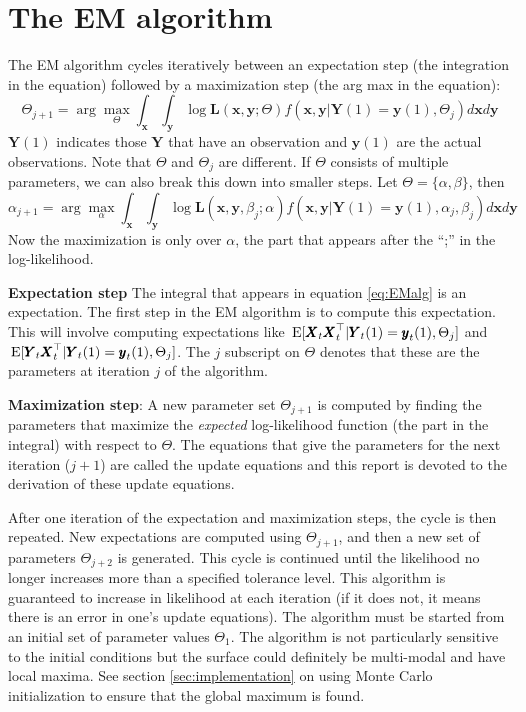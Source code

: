\documentclass[]{article}
\def\E{\,\textup{\textrm{E}}}
\def\LL{\mbox{$\mathbf L$}}	\def\ll{\mbox{$\mathbf l$}}
\def\XX{\mbox{$\pmb{X}$}}	\def\xx{\mbox{$\pmb{x}$}}
\def\YY{\mbox{$\pmb{Y}$}}	\def\yy{\mbox{$\pmb{y}$}}
\begin{document}
\section{The EM algorithm}\label{sec:EMalgorithm}
The EM algorithm cycles iteratively between an expectation step (the integration in the equation) followed by a maximization step (the arg max in the equation):
\begin{equation}\label{eq:EMalg}
\Theta_{j+1} = \arg \underset{\Theta}{\max} \int_{\xx}{\int_{\yy}{\log\LL(\xx,\yy;\Theta) f(\xx,\yy|\YY(1)=\yy(1),\Theta_j)d\xx d\yy}}
\end{equation}
$\YY(1)$ indicates those $\YY$ that have an observation and $\yy(1)$ are the actual observations. Note that $\Theta$ and $\Theta_j$ are different.  If $\Theta$ consists of multiple parameters, we can also break this down into smaller steps.  Let $\Theta=\{\alpha,\beta\}$, then
\begin{equation}\label{eq:EMalg.j}
\alpha_{j+1} = \arg \underset{\alpha}{\max} \int_{\xx}{\int_{\yy}{\log\LL(\xx,\yy,\beta_j;\alpha) f(\xx,\yy|\YY(1)=\yy(1),\alpha_j,\beta_j)d\xx d\yy}}
\end{equation}
Now the maximization is only over $\alpha$, the part that appears after the ``;'' in the log-likelihood.

\textbf{Expectation step} The integral that appears in equation \ref{eq:EMalg} is an expectation. The first step in the EM algorithm is to compute this expectation.  This will involve computing expectations like $\E[\XX_t\XX_t^\top|\YY_t(1)=\yy_t(1),\Theta_j]$ and $\E[\YY_t\XX_t^\top|\YY_t(1)=\yy_t(1),\Theta_j]$. The $j$ subscript on $\Theta$ denotes that these are the parameters at iteration $j$ of the algorithm.

\textbf{Maximization step}: A new parameter set $\Theta_{j+1}$ is computed by finding the parameters that maximize the \textit{expected} log-likelihood function (the part in the integral) with respect to $\Theta$.  The equations that give the parameters for the next iteration ($j+1$) are called the update equations and this report is devoted to the derivation of these update equations.

After one iteration of the expectation and maximization steps, the cycle is then repeated. New expectations  are computed using $\Theta_{j+1}$, and then a new set of parameters $\Theta_{j+2}$ is generated.  This cycle is continued until the likelihood no longer increases more than a specified tolerance level.   This algorithm is guaranteed to increase in likelihood at each iteration (if it does not, it means there is an error in one's update equations).  The algorithm must be started from an initial set of parameter values $\Theta_1$.  The algorithm is not particularly sensitive to the initial conditions but the surface could definitely be multi-modal and have local maxima.  See section \ref{sec:implementation} on using Monte Carlo initialization to ensure that the global maximum is found.
\end{document}
